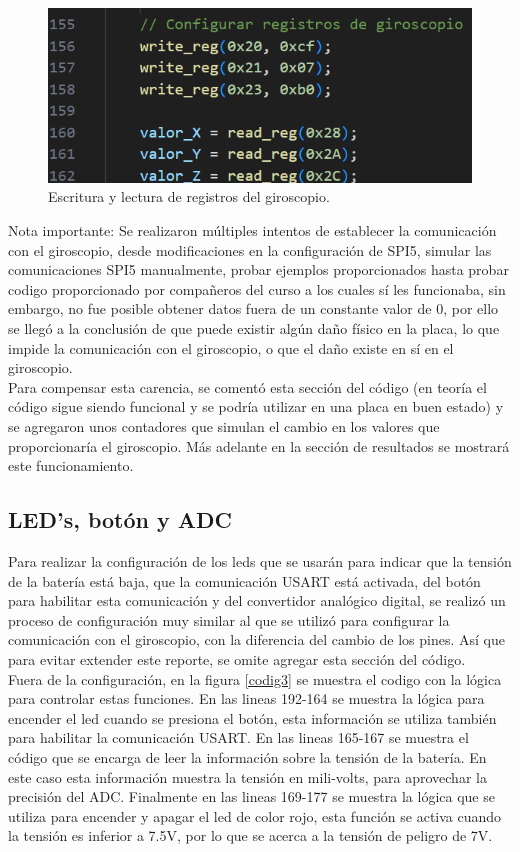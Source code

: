 \begin{figure}[H]
    \centering
    \includegraphics[scale=.5]{Imagenes/codig2.png}
    \caption{Escritura y lectura de registros del giroscopio.}
    \label{codig2}
\end{figure}


Nota importante: Se realizaron múltiples intentos de establecer la comunicación con el giroscopio, desde modificaciones en la configuración de SPI5, simular las comunicaciones SPI5 manualmente, probar ejemplos proporcionados hasta probar codigo proporcionado por compañeros del curso a los cuales sí les funcionaba, sin embargo, no fue posible obtener datos fuera de un constante valor de 0, por ello se llegó a la conclusión de que puede existir algún daño físico en la placa, lo que impide la comunicación con el giroscopio, o que el daño existe en sí en el giroscopio.\\
Para compensar esta carencia, se comentó esta sección del código (en teoría el código sigue siendo funcional y se podría utilizar en una placa en buen estado) y se agregaron unos contadores que simulan el cambio en los valores que proporcionaría el giroscopio. Más adelante en la sección de resultados se mostrará este funcionamiento.

\subsection{LED's, botón y ADC}
Para realizar la configuración de los leds que se usarán para indicar que la tensión de la batería está baja, que la comunicación USART está activada, del botón para habilitar esta comunicación y del convertidor analógico digital, se realizó un proceso de configuración muy similar al que se utilizó para configurar la comunicación con el giroscopio, con la diferencia del cambio de los pines. Así que para evitar extender este reporte, se omite agregar esta sección del código.\\
Fuera de la configuración, en la figura \ref{codig3} se muestra el codigo con la lógica para controlar estas funciones. En las lineas 192-164 se muestra la lógica para encender el led cuando se presiona el botón, esta información se utiliza también para habilitar la comunicación USART. En las lineas 165-167 se muestra el código que se encarga de leer la información sobre la tensión de la batería. En este caso esta información muestra la tensión en mili-volts, para aprovechar la precisión del ADC. Finalmente en las lineas 169-177 se muestra la lógica que se utiliza para encender y apagar el led de color rojo, esta función se activa cuando la tensión es inferior a 7.5V, por lo que se acerca a la tensión de peligro de 7V.

